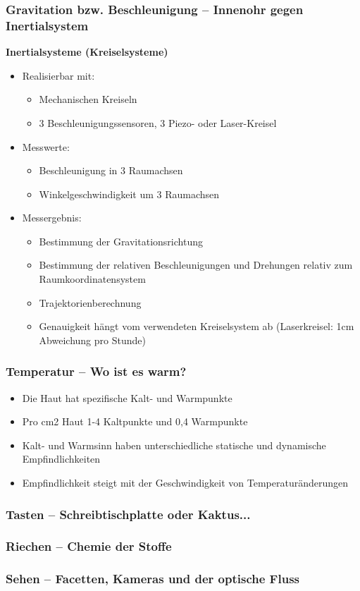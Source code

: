 \subsubsection{Gravitation bzw. Beschleunigung – Innenohr gegen Inertialsystem}
\textbf{Inertialsysteme (Kreiselsysteme)}
\begin{itemize}
\setlength\itemsep{0em}
\item Realisierbar mit:
\begin{itemize}
\setlength\itemsep{0em}
\item Mechanischen Kreiseln
\item 3 Beschleunigungssensoren, 3 Piezo- oder Laser-Kreisel
\end{itemize}
\item Messwerte:
\begin{itemize}
\setlength\itemsep{0em}
\item Beschleunigung in 3 Raumachsen
\item Winkelgeschwindigkeit um 3 Raumachsen
\end{itemize}
\item Messergebnis:
\begin{itemize}
\setlength\itemsep{0em}
\item Bestimmung der Gravitationsrichtung
\item Bestimmung der relativen Beschleunigungen und Drehungen relativ zum Raumkoordinatensystem
\item  Trajektorienberechnung
\item Genauigkeit hängt vom verwendeten Kreiselsystem ab (Laserkreisel: 1cm Abweichung pro Stunde)
\end{itemize}
\end{itemize}
\subsubsection{Temperatur – Wo ist es warm?}
\begin{itemize}
\setlength\itemsep{0em}
\item Die Haut hat spezifische Kalt- und Warmpunkte
\item Pro cm2 Haut 1-4 Kaltpunkte und 0,4 Warmpunkte
\item Kalt- und Warmsinn haben unterschiedliche statische und dynamische Empfindlichkeiten
\item Empfindlichkeit steigt mit der Geschwindigkeit von Temperaturänderungen
\end{itemize}
\subsubsection{Tasten – Schreibtischplatte oder Kaktus...}
\subsubsection{Riechen – Chemie der Stoffe}
\subsubsection{Sehen – Facetten, Kameras und der optische Fluss}
